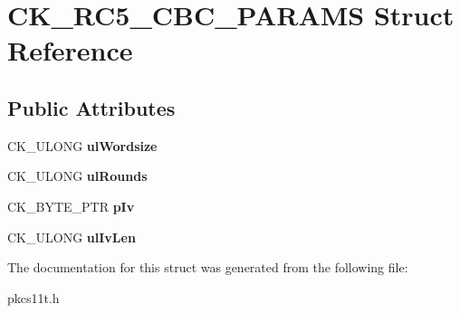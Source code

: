 \hypertarget{struct_c_k___r_c5___c_b_c___p_a_r_a_m_s}{}\section{C\+K\+\_\+\+R\+C5\+\_\+\+C\+B\+C\+\_\+\+P\+A\+R\+A\+MS Struct Reference}
\label{struct_c_k___r_c5___c_b_c___p_a_r_a_m_s}
\subsection*{Public Attributes}
\begin{DoxyCompactItemize}
\item 
\mbox{\label{struct_c_k___r_c5___c_b_c___p_a_r_a_m_s_a8c73bb58423c42d45a96a32c206c408a}} 
C\+K\+\_\+\+U\+L\+O\+NG {\bfseries ul\+Wordsize}
\item 
\mbox{\label{struct_c_k___r_c5___c_b_c___p_a_r_a_m_s_aba2db9c3d541acf5bdd8b1ba6ff8699e}} 
C\+K\+\_\+\+U\+L\+O\+NG {\bfseries ul\+Rounds}
\item 
\mbox{\label{struct_c_k___r_c5___c_b_c___p_a_r_a_m_s_a1441cbb43877674445af7a863bf5ee39}} 
C\+K\+\_\+\+B\+Y\+T\+E\+\_\+\+P\+TR {\bfseries p\+Iv}
\item 
\mbox{\label{struct_c_k___r_c5___c_b_c___p_a_r_a_m_s_ac1636fd00784fd3994a40a4f1668a8f8}} 
C\+K\+\_\+\+U\+L\+O\+NG {\bfseries ul\+Iv\+Len}
\end{DoxyCompactItemize}


The documentation for this struct was generated from the following file\+:\begin{DoxyCompactItemize}
\item 
pkcs11t.\+h\end{DoxyCompactItemize}
